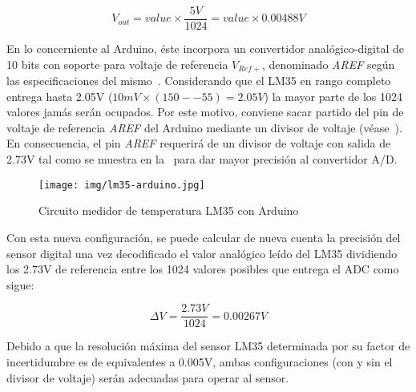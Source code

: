 \begin{equation}
V_{out}= value \times \frac{ 5V }{ 1024 } = value \times 0.00488V
\end{equation}

En lo concerniente al Arduino, éste incorpora un convertidor analógico-digital de 10 bits con soporte para voltaje de referencia $V_{Ref+}$, denominado \emph{AREF} según las especificaciones del mismo~.
Considerando que el LM35 en rango completo entrega hasta 2.05V ($10mV\times (150 - -55) = 2.05V$) la mayor parte de los 1024 valores jamás serán ocupados.
Por este motivo, conviene sacar partido del pin de voltaje de referencia \emph{AREF} del Arduino mediante un divisor de voltaje (véase~).
En consecuencia, el pin \emph{AREF} requerirá de un divisor de voltaje con salida de 2.73V tal como se muestra en la~ para dar mayor precisión al convertidor A/D.

\begin{figure}
	\centering
	\texttt{[image: img/lm35-arduino.jpg]}
	\caption{Circuito medidor de temperatura LM35 con Arduino}
	\label{fig:lm35-arduino} %
\end{figure}

Con esta nueva configuración, se puede calcular de nueva cuenta la precisión del sensor digital una vez decodificado el valor analógico leído del LM35 dividiendo los 2.73V de referencia entre los 1024 valores posibles que entrega el ADC como sigue:

\begin{equation}
\Delta V = \frac{ 2.73V }{ 1024 } =  0.00267V
\end{equation}

Debido a que la resolución máxima del sensor LM35 determinada por su factor de incertidumbre es de  equivalentes a 0.005V, ambas configuraciones (con y sin el divisor de voltaje) serán adecuadas para operar al sensor.
